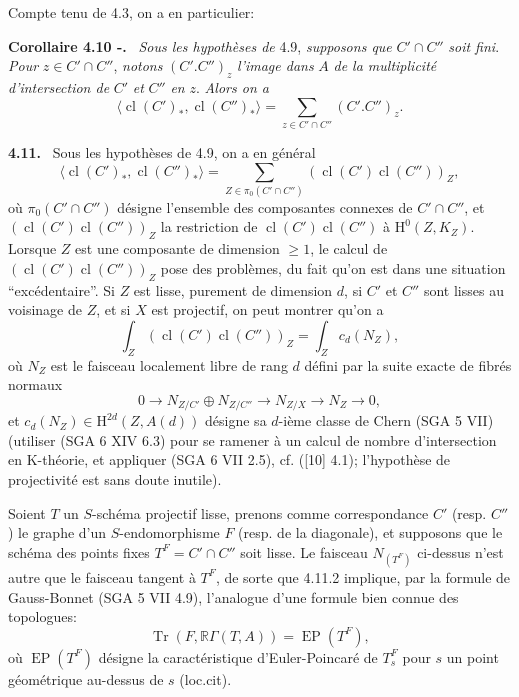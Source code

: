 \documentclass[11pt]{article}
\newenvironment{statement}[1]{\par\medskip\noindent\textbf{#1.}\ }{\par\medskip}
\renewcommand{\H}{\mathrm{H}}
\newcommand{\R}{\mathbb{R}}\newcommand{\RHomCore}{\mathbb{R}\mathrm{Hom}}
\providecommand{\cl}{\operatorname{cl}}
\providecommand{\Tr}{\operatorname{Tr}}
\providecommand{\EP}{\operatorname{EP}}
\providecommand{\Tr}{\operatorname{Tr}}
\providecommand{\Tr}{\operatorname{Tr}}
\providecommand{\R}{\mathrm R}
\providecommand{\Tr}{\operatorname{Tr}}
\providecommand{\cl}{\operatorname{cl}}
\providecommand{\EP}{\operatorname{EP}}
\providecommand{\cl}{\operatorname{cl}}
\providecommand{\Tr}{\operatorname{Tr}}
\begin{document}
Compte tenu de 4.3, on a en particulier:

\begin{statement}{Corollaire 4.10 -}
\emph{Sous les hypothèses de} 4.9, \emph{supposons que} $C'\cap C''$ \emph{soit fini}. \emph{Pour} $z\in C'\cap C''$, \emph{notons} $(C'.C'')_z$ \emph{l'image dans} $A$ \emph{de la multiplicité d'intersection de} $C'$ \emph{et} $C''$ \emph{en} $z$. \emph{Alors on a}
\[
\langle \cl(C')_*,\cl(C'')_*\rangle
=
\sum_{z\in C'\cap C''}(C'.C'')_z.
\]
\end{statement}

\begin{statement}{4.11}
Sous les hypothèses de 4.9, on a en général
\begin{equation}
\tag{4.11.1}
\langle \cl(C')_*,\cl(C'')_*\rangle
=
\sum_{Z\in\pi_0(C'\cap C'')}(\cl(C')\cl(C''))_Z,
\end{equation}
où $\pi_0(C'\cap C'')$ désigne l'ensemble des composantes connexes de $C'\cap C''$, et $(\cl(C')\cl(C''))_Z$ la restriction de $\cl(C')\cl(C'')$ à $\H^0(Z,K_Z)$. Lorsque $Z$ est une composante de dimension $\geq 1$, le calcul de $(\cl(C')\cl(C''))_Z$ pose des problèmes, du fait qu'on est dans une situation ``excédentaire''. Si $Z$ est lisse, purement de dimension $d$, si $C'$ et $C''$ sont lisses au voisinage de $Z$, et si $X$ est projectif, on peut montrer qu'on a
\begin{equation}
\tag{4.11.2}
\int_Z(\cl(C')\cl(C''))_Z=\int_Z c_d(N_Z),
\end{equation}
où $N_Z$ est le faisceau localement libre de rang $d$ défini par la suite exacte de fibrés normaux
\[
0\longrightarrow N_{Z/C'}\oplus N_{Z/C''}\longrightarrow N_{Z/X}\longrightarrow N_Z\longrightarrow 0,
\]
et $c_d(N_Z)\in \H^{2d}(Z,A(d))$ désigne sa $d$-ième classe de Chern (SGA 5 VII) (utiliser (SGA 6 XIV 6.3) pour se ramener à un calcul de nombre d'intersection en K-théorie, et appliquer (SGA 6 VII 2.5), cf. ([10] 4.1); l'hypothèse de projectivité est sans doute inutile).

Soient $T$ un $S$-schéma projectif lisse, prenons comme correspondance $C'$ (resp. $C''$) le graphe d'un $S$-endomorphisme $F$ (resp. de la diagonale), et supposons que le schéma des points fixes $T^F=C'\cap C''$ soit lisse. Le faisceau $N_{(T^F)}$ ci-dessus n'est autre que le faisceau tangent à $T^F$, de sorte que 4.11.2 implique, par la formule de Gauss-Bonnet (SGA 5 VII 4.9), l'analogue d'une formule bien connue des topologues:
\begin{equation}
\tag{4.11.3}
\Tr(F,\R\Gamma(T,A))=\EP(T^F),
\end{equation}
où $\EP(T^F)$ désigne la caractéristique d'Euler-Poincaré de $T_s^F$ pour $s$ un point géométrique au-dessus de $s$ (loc.cit).
\end{statement}
\end{document}
